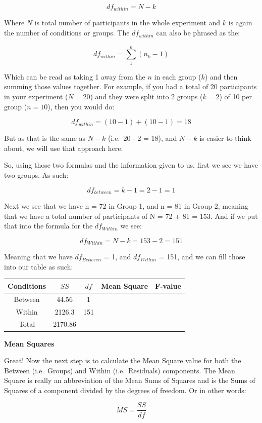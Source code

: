 \documentclass[
  oneside]{book}
\begin{document}
\[df_{within} = N - k\]

Where \(N\) is total number of participants in the whole experiment and \(k\) is again the number of conditions or groups. The \(df_{within}\) can also be phrased as the:

\[df_{within} = \sum_1^k(n_{k}-1)\]

Which can be read as taking 1 away from the \(n\) in each group (\(k\)) and then summing those values together. For example, if you had a total of 20 participants in your experiment (\(N = 20\)) and they were split into 2 groups (\(k = 2\)) of 10 per group (\(n = 10\)), then you would do:

\[df_{within} = (10-1)+(10-1) = 18\]

But as that is the same as \(N-k\) (i.e.~20 - 2 = 18), and \(N-k\) is easier to think about, we will use that approach here.

So, using those two formulas and the information given to us, first we see we have two groups. As such:

\[df_{between} = k - 1 = 2 - 1 = 1\]

Next we see that we have n = 72 in Group 1, and n = 81 in Group 2, meaning that we have a total number of participants of N = 72 + 81 = 153. And if we put that into the formula for the \(df_{Within}\) we see:

\[df_{Within} = N-k = 153 - 2 = 151\]

Meaning that we have \(df_{Between}\) = 1, and \(df_{Within}\) = 151, and we can fill those into our table as such:

\begin{longtable}[]{@{}ccccc@{}}
\toprule
Conditions & \(SS\) & \(df\) & Mean Square & F-value \\
\midrule
\endhead
Between & 44.56 & 1 & & \\
Within & 2126.3 & 151 & & \\
Total & 2170.86 & & & \\
\bottomrule
\end{longtable}

\textbf{Mean Squares}

Great! Now the next step is to calculate the Mean Square value for both the Between (i.e.~Groups) and Within (i.e.~Residuals) components. The Mean Square is really an abbreviation of the Mean Sums of Squares and is the Sums of Squares of a component divided by the degrees of freedom. Or in other words:

\[MS = \frac{SS}{df}\]
\end{document}
